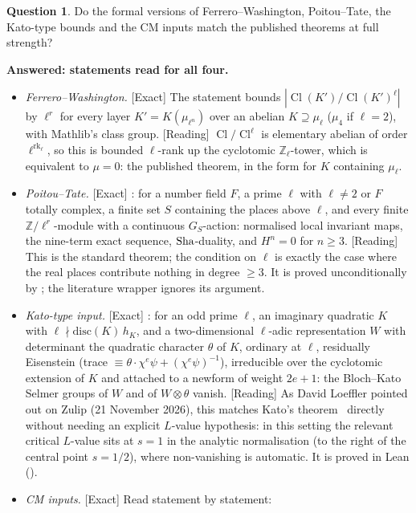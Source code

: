 \documentclass[11pt]{article}
\newcommand{\Exact}{\textcolor{exactc}{\textsf{\small[Exact]}}}
\newcommand{\Reading}{\textcolor{readc}{\textsf{\small[Reading]}}}
\newcommand{\Z}{\mathbb{Z}}
\newcommand{\rk}{\operatorname{rk}}
\newcommand{\Cl}{\operatorname{Cl}}
\theoremstyle{plain}
\theoremstyle{definition}
\newtheorem{question}{Question}
\begin{document}
\begin{question}
Do the formal versions of Ferrero--Washington, Poitou--Tate, the Kato-type bounds and the CM inputs
match the published theorems at full strength?
\end{question}
\noindent\textbf{Answered: statements read for all four.}
\begin{itemize}
\item \emph{Ferrero--Washington.} \Exact{} The statement bounds $|\Cl(K')/\Cl(K')^\ell|$ by $\ell^r$
  for every layer $K'=K(\mu_{\ell^n})$ over an abelian $K\supseteq\mu_\ell$ ($\mu_4$ if $\ell=2$),
  with Mathlib's class group. \Reading{} $\Cl/\Cl^\ell$ is elementary abelian of order
  $\ell^{\rk_\ell}$, so this is bounded $\ell$-rank up the cyclotomic $\Z_\ell$-tower, which is
  equivalent to $\mu=0$: the published theorem, in the form for $K$ containing $\mu_\ell$.
\item \emph{Poitou--Tate.} \Exact{} : for a number field $F$, a prime
  $\ell$ with $\ell\neq2$ or $F$ totally complex, a finite set $S$ containing the places above
  $\ell$, and every finite $\Z/\ell^r$-module with a continuous $G_S$-action: normalised local
  invariant maps, the nine-term exact sequence, $\mathrm{Sha}$-duality, and $H^n=0$ for $n\ge3$.
  \Reading{} This is the standard theorem; the condition on $\ell$ is exactly the case where the
  real places contribute nothing in degree $\ge3$. It is proved unconditionally by
  ; the literature wrapper ignores its argument.
\item \emph{Kato-type input.} \Exact{} : for an odd prime $\ell$, an imaginary
  quadratic $K$ with $\ell\nmid \mathrm{disc}(K)\,h_K$, and a two-dimensional $\ell$-adic
  representation $W$ with determinant the quadratic character $\theta$ of $K$, ordinary at $\ell$,
  residually Eisenstein (trace $\equiv\theta\cdot\chi^e\psi+(\chi^e\psi)^{-1}$), irreducible over the
  cyclotomic extension of $K$ and attached to a newform of weight $2e+1$: the Bloch--Kato Selmer
  groups of $W$ and of $W\otimes\theta$ vanish. \Reading{} As David Loeffler pointed out on Zulip
  (21 November 2026), this matches Kato's theorem~\cite{kato} directly without needing an explicit
  $L$-value hypothesis: in this setting the relevant critical $L$-value sits at $s = 1$ in the
  analytic normalisation (to the right of the central point $s = 1/2$), where non-vanishing is
  automatic. It is proved in Lean ().
\item \emph{CM inputs.} \Exact{} Read statement by statement:

\end{itemize}
\end{document}
